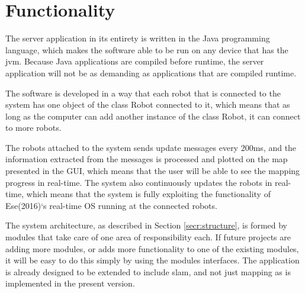 \section{Functionality}
The server application in its entirety is written in the Java programming language, which makes the software able to be run on any device that has the \acrlong{jvm}. Because Java applications are compiled before runtime, the server application will not be as demanding as applications that are compiled runtime. 

The software is developed in a way that each robot that is connected to the system has one object of the class Robot connected to it, which means that as long as the computer can add another instance of the class Robot, it can connect to more robots. 

The robots attached to the system sends update messages every 200ms, and the information extracted from the messages is processed and plotted on the map presented in the GUI, which means that the user will be able to see the mapping progress in real-time. The system also continuously updates the robots in real-time, which means that the system is fully exploiting the functionality of Ese(2016)`s real-time OS running at the connected robots.

The system architecture, as described in Section \ref{secr:structure}, is formed by modules that take care of one area of responsibility each. If future projects are adding more modules, or adds more functionality to one of the existing modules, it will be easy to do this simply by using the modules interfaces. The application is already designed to be extended to include \acrfull{slam}, and not just mapping as is implemented in the present version.